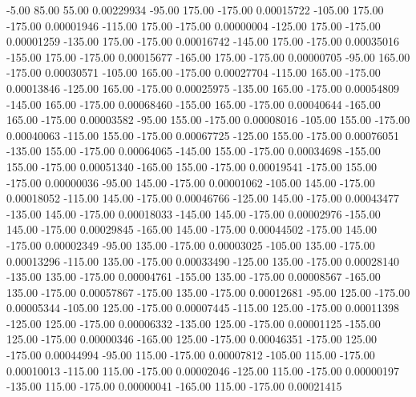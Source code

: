      -5.00     85.00     55.00     0.00229934
    -95.00    175.00   -175.00     0.00015722
   -105.00    175.00   -175.00     0.00001946
   -115.00    175.00   -175.00     0.00000004
   -125.00    175.00   -175.00     0.00001259
   -135.00    175.00   -175.00     0.00016742
   -145.00    175.00   -175.00     0.00035016
   -155.00    175.00   -175.00     0.00015677
   -165.00    175.00   -175.00     0.00000705
    -95.00    165.00   -175.00     0.00030571
   -105.00    165.00   -175.00     0.00027704
   -115.00    165.00   -175.00     0.00013846
   -125.00    165.00   -175.00     0.00025975
   -135.00    165.00   -175.00     0.00054809
   -145.00    165.00   -175.00     0.00068460
   -155.00    165.00   -175.00     0.00040644
   -165.00    165.00   -175.00     0.00003582
    -95.00    155.00   -175.00     0.00008016
   -105.00    155.00   -175.00     0.00040063
   -115.00    155.00   -175.00     0.00067725
   -125.00    155.00   -175.00     0.00076051
   -135.00    155.00   -175.00     0.00064065
   -145.00    155.00   -175.00     0.00034698
   -155.00    155.00   -175.00     0.00051340
   -165.00    155.00   -175.00     0.00019541
   -175.00    155.00   -175.00     0.00000036
    -95.00    145.00   -175.00     0.00001062
   -105.00    145.00   -175.00     0.00018052
   -115.00    145.00   -175.00     0.00046766
   -125.00    145.00   -175.00     0.00043477
   -135.00    145.00   -175.00     0.00018033
   -145.00    145.00   -175.00     0.00002976
   -155.00    145.00   -175.00     0.00029845
   -165.00    145.00   -175.00     0.00044502
   -175.00    145.00   -175.00     0.00002349
    -95.00    135.00   -175.00     0.00003025
   -105.00    135.00   -175.00     0.00013296
   -115.00    135.00   -175.00     0.00033490
   -125.00    135.00   -175.00     0.00028140
   -135.00    135.00   -175.00     0.00004761
   -155.00    135.00   -175.00     0.00008567
   -165.00    135.00   -175.00     0.00057867
   -175.00    135.00   -175.00     0.00012681
    -95.00    125.00   -175.00     0.00005344
   -105.00    125.00   -175.00     0.00007445
   -115.00    125.00   -175.00     0.00011398
   -125.00    125.00   -175.00     0.00006332
   -135.00    125.00   -175.00     0.00001125
   -155.00    125.00   -175.00     0.00000346
   -165.00    125.00   -175.00     0.00046351
   -175.00    125.00   -175.00     0.00044994
    -95.00    115.00   -175.00     0.00007812
   -105.00    115.00   -175.00     0.00010013
   -115.00    115.00   -175.00     0.00002046
   -125.00    115.00   -175.00     0.00000197
   -135.00    115.00   -175.00     0.00000041
   -165.00    115.00   -175.00     0.00021415
